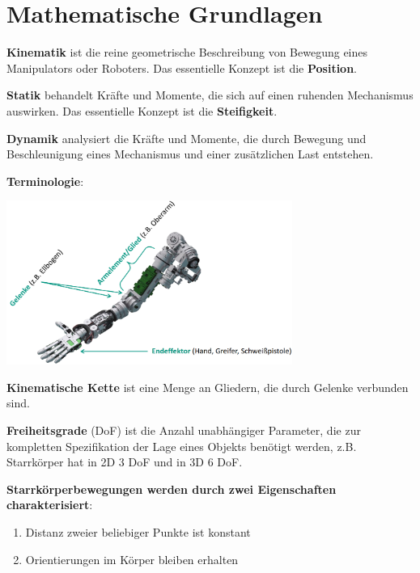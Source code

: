 \section{Mathematische Grundlagen}

\textbf{Kinematik} ist die reine geometrische Beschreibung von Bewegung eines Manipulators
oder Roboters. Das essentielle Konzept ist die \textbf{Position}.

\textbf{Statik} behandelt Kräfte und Momente, die sich auf einen ruhenden Mechanismus
auswirken. Das essentielle Konzept ist die \textbf{Steifigkeit}.

\textbf{Dynamik} analysiert die Kräfte und Momente, die durch Bewegung und Beschleunigung
eines Mechanismus und einer zusätzlichen Last entstehen.

\textbf{Terminologie}:
\begin{center}
	\includegraphics[width=0.7\textwidth]{images/arm.png}
\end{center}
\medskip
\textbf{Kinematische Kette} ist eine Menge an Gliedern, die durch Gelenke verbunden sind.

\textbf{Freiheitsgrade} (DoF) ist die Anzahl unabhängiger Parameter, die zur kompletten Spezifikation der Lage eines Objekts benötigt werden, z.B. Starrkörper hat in 2D 3 DoF und in 3D 6 DoF.

\textbf{Starrkörperbewegungen werden durch zwei Eigenschaften charakterisiert}:
\begin{enumerate}
	\item Distanz zweier beliebiger Punkte ist konstant
	\item Orientierungen im Körper bleiben erhalten
\end{enumerate}

